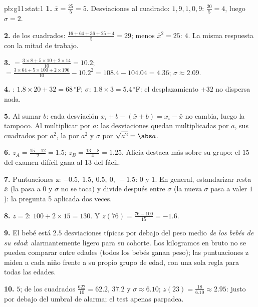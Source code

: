 \begin{solution}{pb:g11:stat:1}
\textbf{1.}  $\bar x = \frac{25}{5} = 5$. Desviaciones al cuadrado:
$1, 9, 1, 0, 9$:  $\frac{20}{5} = 4$, luego $\sigma = 2$.

\textbf{2.}  de los cuadrados:
$\frac{16 + 64 + 36 + 25 + 4}{5} = 29$; menos $\bar x^2 = 25$: 
$4$. La misma respuesta con la mitad de trabajo.

\textbf{3.}  $= \frac{3 \times 8 + 5 \times 10 + 2 \times
14}{10} = 10.2$;  $= \frac{3 \times 64 + 5 \times 100 +
2 \times 196}{10} - 10.2^2 = 108.4 - 104.04 = 4.36$;
$\sigma \approx 2.09$.

\textbf{4.} : $1.8 \times 20 + 32 = 68\,^\circ$F; $\sigma$:
$1.8 \times 3 = 5.4\,^\circ$F: el desplazamiento $+32$ no dispersa nada.

\textbf{5.} Al sumar $b$: cada desviación
$x_i + b - (\bar x + b) = x_i - \bar x$ no cambia, luego la 
tampoco. Al multiplicar por $a$: las desviaciones quedan multiplicadas por
$a$, sus cuadrados por $a^2$, la  por $a^2$ y $\sigma$ por
$\sqrt{a^2} = \abs a$.

\textbf{6.} $z_A = \frac{15 - 12}{2} = 1.5$;
$z_B = \frac{13 - 8}{4} = 1.25$. Alicia destaca más sobre su grupo: el
$15$ del examen difícil gana al $13$ del fácil.

\textbf{7.} Puntuaciones z: $-0.5,\ 1.5,\ 0.5,\ 0,\ -1.5$:  $0$ y
 $1$. En general, estandarizar resta $\bar x$ (la 
pasa a $0$ y $\sigma$ no se toca) y divide después entre $\sigma$ (la
nueva $\sigma$ pasa a valer $1$): la pregunta 5 aplicada dos veces.

\textbf{8.} $z = 2$: $100 + 2 \times 15 = 130$. Y
$z(76) = \frac{76 - 100}{15} = -1.6$.

\textbf{9.} El bebé está $2.5$ desviaciones típicas por debajo del peso
medio \emph{de los bebés de su edad}: alarmantemente ligero para su
cohorte. Los kilogramos en bruto no se pueden comparar entre edades (todos
los bebés ganan peso); las puntuaciones z miden a cada niño frente a su
propio grupo de edad, con una sola regla para todas las edades.

\textbf{10.}  $5$;  de los cuadrados
$\frac{622}{10} = 62.2$,  $37.2$ y $\sigma \approx 6.10$;
$z(23) = \frac{18}{6.10} \approx 2.95$: justo por debajo del umbral de
alarma; el test apenas parpadea.


\end{solution}
